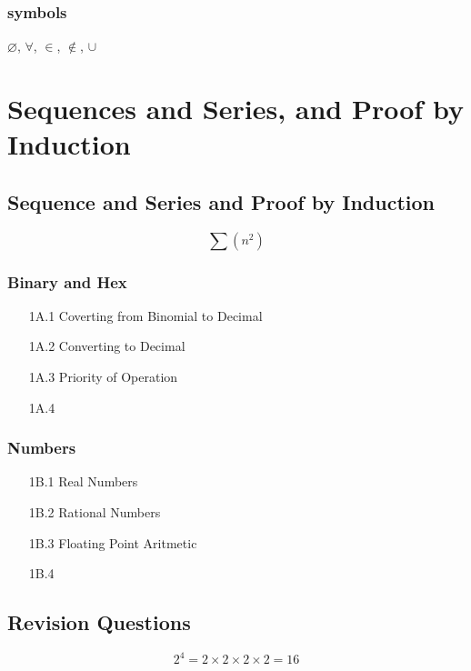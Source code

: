 \documentclass[]{report}
\begin{document}
\subsection*{symbols}
$\varnothing$,
$\forall$,
$\in$,
$\notin$,
$\cup$

\chapter{Sequences and Series, and Proof by Induction}
\section{Sequence and Series and Proof by Induction}


\[\sum (n^2) \]



\subsection*{Binary and Hex}
\begin{itemize}
\item[1A.1] Coverting from Binomial to Decimal
\item[1A.2] Converting to Decimal
\item[1A.3] Priority of Operation
\item[1A.4] 
\end{itemize}

\subsection*{Numbers}
\begin{itemize}
\item[1B.1] Real Numbers
\item[1B.2] Rational Numbers
\item[1B.3] Floating Point Aritmetic
\item[1B.4] 
\end{itemize}



\section{Revision Questions}



\[  2^ 4 = 2 \times 2 \times 2 \times 2 = 16 \]
\end{document}

